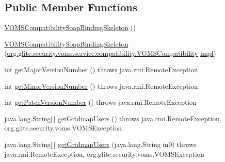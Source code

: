 \subsection*{Public Member Functions}
\begin{DoxyCompactItemize}
\item 
\hyperlink{classorg_1_1glite_1_1security_1_1voms_1_1service_1_1compatibility_1_1VOMSCompatibilitySoapBindingSkeleton_a49acf4746f43aa53a43c6427bb950417}{VOMSCompatibilitySoapBindingSkeleton} ()
\item 
\hyperlink{classorg_1_1glite_1_1security_1_1voms_1_1service_1_1compatibility_1_1VOMSCompatibilitySoapBindingSkeleton_a3270d154b58ade976e267c54c891abf3}{VOMSCompatibilitySoapBindingSkeleton} (\hyperlink{interfaceorg_1_1glite_1_1security_1_1voms_1_1service_1_1compatibility_1_1VOMSCompatibility}{org.glite.security.voms.service.compatibility.VOMSCompatibility} \hyperlink{classorg_1_1glite_1_1security_1_1voms_1_1service_1_1compatibility_1_1VOMSCompatibilitySoapBindingSkeleton_a36ff3050b5c95f7655bd883de30eaaca}{impl})
\item 
int \hyperlink{classorg_1_1glite_1_1security_1_1voms_1_1service_1_1compatibility_1_1VOMSCompatibilitySoapBindingSkeleton_a7a8549ce72ec15b323f2648ae3b1853e}{getMajorVersionNumber} ()  throws java.rmi.RemoteException     
\item 
int \hyperlink{classorg_1_1glite_1_1security_1_1voms_1_1service_1_1compatibility_1_1VOMSCompatibilitySoapBindingSkeleton_ac97f2c8961f2adfeb6a537a044174656}{getMinorVersionNumber} ()  throws java.rmi.RemoteException     
\item 
int \hyperlink{classorg_1_1glite_1_1security_1_1voms_1_1service_1_1compatibility_1_1VOMSCompatibilitySoapBindingSkeleton_a3f3241b77d95d0eb0d7e7043f9a6502f}{getPatchVersionNumber} ()  throws java.rmi.RemoteException     
\item 
java.lang.String\mbox{[}$\,$\mbox{]} \hyperlink{classorg_1_1glite_1_1security_1_1voms_1_1service_1_1compatibility_1_1VOMSCompatibilitySoapBindingSkeleton_a81810a865aecfeda9f03f3d79a937b04}{getGridmapUsers} ()  throws java.rmi.RemoteException, org.glite.security.voms.VOMSException     
\item 
java.lang.String\mbox{[}$\,$\mbox{]} \hyperlink{classorg_1_1glite_1_1security_1_1voms_1_1service_1_1compatibility_1_1VOMSCompatibilitySoapBindingSkeleton_a3f14aac54dbfe5b8fb196abe51891231}{getGridmapUsers} (java.lang.String in0)  throws java.rmi.RemoteException, org.glite.security.voms.VOMSException     
\end{DoxyCompactItemize}
